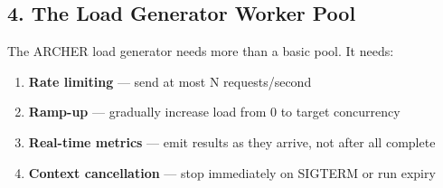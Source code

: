 \documentclass[11pt,a4paper,oneside]{book}
\providecommand{\tightlist}{\setlength{\itemsep}{0pt}\setlength{\parskip}{0pt}}
\begin{document}
\subsection{4. The Load Generator Worker
Pool}

The ARCHER load generator needs more than a basic pool. It needs:

\begin{enumerate}
\def\labelenumi{\arabic{enumi}.}
\tightlist
\item
  \textbf{Rate limiting} --- send at most N requests/second
\item
  \textbf{Ramp-up} --- gradually increase load from 0 to target
  concurrency
\item
  \textbf{Real-time metrics} --- emit results as they arrive, not after
  all complete
\item
  \textbf{Context cancellation} --- stop immediately on SIGTERM or run
  expiry
\end{enumerate}
\end{document}
